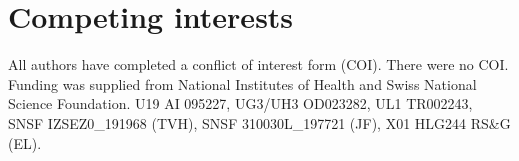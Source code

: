 \documentclass{article} %
\begin{document}
\section*{Competing interests}
All authors have completed a conflict of interest form (COI). 
There were no COI. 
Funding was supplied from National Institutes of Health 
and Swiss National Science Foundation.
U19 AI 095227, UG3/UH3 OD023282, UL1 TR002243, SNSF IZSEZ0\_191968   (TVH), SNSF 310030L\_197721 (JF), X01 HLG244 RS\&G (EL).

%



%
%
%
%
%
%
%
%
%
\end{document}
